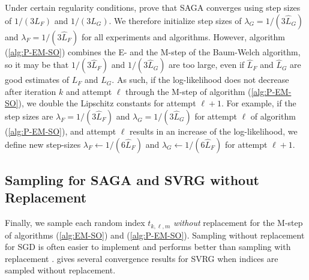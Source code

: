 Under certain regularity conditions, \citet{Defazio:2014} prove that SAGA converges using step sizes of $1/(3L_F)$ and $1/(3L_G)$. We therefore initialize step sizes of $\lambda_G = 1/(3 \hat L_G)$ and $\lambda_F = 1/(3 \hat L_F)$ for all experiments and algorithms. However, algorithm (\ref{alg:P-EM-SO}) combines the E- and the M-step of the Baum-Welch algorithm, so it may be that $1/(3 \hat L_F)$ and $1/(3 \hat L_G)$ are too large, even if $\hat L_F$ and $\hat L_G$ are good estimates of $L_F$ and $L_G$. As such, if the log-likelihood does not decrease after iteration $k$ and attempt $\ell$ through the M-step of algorithm (\ref{alg:P-EM-SO}), we double the Lipschitz constants for attempt $\ell+1$. For example, if the step sizes are $\lambda_F = 1/(3 \hat L_F)$ and $\lambda_G = 1/(3 \hat L_G)$ for attempt $\ell$ of algorithm (\ref{alg:P-EM-SO}), and attempt $\ell$ results in an increase of the log-likelihood, we define new step-sizes $\lambda_F \leftarrow 1/(6 \hat L_F)$ and $\lambda_G \leftarrow 1/(6 \hat L_F)$ for attempt $\ell+1$.

\subsection{Sampling for SAGA and SVRG without Replacement}
\label{subsec:wo_replacement}

Finally, we sample each random index $t_{k,\ell,m}$ \textit{without} replacement for the M-step of algorithms (\ref{alg:EM-SO}) and (\ref{alg:P-EM-SO}). Sampling without replacement for SGD is often easier to implement and performs better than sampling with replacement \citep{Gurbuzbalaban:2015}. \citet{Ohad:2016} gives several convergence results for SVRG when indices are sampled without replacement.